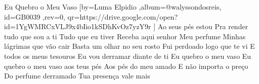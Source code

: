 \beginsong
{Eu Quebro o Meu Vaso %
}[by={Luma Elpidio %
},album={@walyssondosreis},
id={GB0039 %
},rev={0}, %
qr={https://drive.google.com/open?id=1YgWMRCxVLJ9x4bIio1kSDhKvOz7yzY9r %
}]
\beginverse*
Ao seus pés estou
Pra render tudo que sou a ti
Tudo que eu tiver
Receba aqui senhor
Meu perfume
Minhas lágrimas que vão cair
\endverse
\beginverse*
Basta um olhar no seu rosto
Fui perdoado logo que te vi
E todos os meus tesouros
Eu vou derramar diante de ti
\endverse
\beginchorus
Eu quebro o meu vaso
Eu quebro o meu vaso aos teus pés
Aos pés do meu amado
\endchorus
\beginverse*
E não importa o preço
Do perfume derramado
Tua presença vale mais
\endverse

